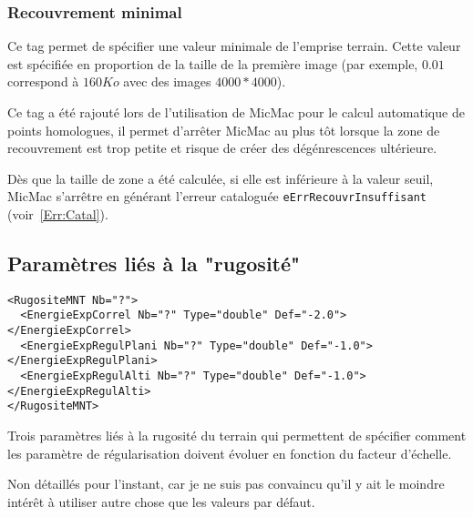 
\subsubsection{Recouvrement minimal}

Ce tag permet de sp\'ecifier une valeur minimale de l'emprise
terrain. Cette valeur est sp\'ecifi\'ee en proportion de la
taille de la premi\`ere image (par exemple, $0.01$ correspond
\`a $160 Ko$ avec des images $4000*4000$).

Ce tag a \'et\'e rajout\'e lors de l'utilisation de MicMac pour
le calcul automatique de points homologues, il permet d'arr\^eter MicMac
au plus t\^ot lorsque la zone de recouvrement est trop petite
et risque de cr\'eer des d\'eg\'enrescences ult\'erieure.

D\`es que la taille de zone a \'et\'e calcul\'ee, si elle est inf\'erieure
\`a la valeur seuil, MicMac s'arr\^etre en g\'en\'erant l'erreur
catalogu\'ee {\tt eErrRecouvrInsuffisant} (voir~\ref{Err:Catal}).



\subsection{Param\`etres li\'es \`a la "rugosit\'e"}

\begin{verbatim}
<RugositeMNT Nb="?">
  <EnergieExpCorrel Nb="?" Type="double" Def="-2.0">      </EnergieExpCorrel>
  <EnergieExpRegulPlani Nb="?" Type="double" Def="-1.0">  </EnergieExpRegulPlani>
  <EnergieExpRegulAlti Nb="?" Type="double" Def="-1.0">   </EnergieExpRegulAlti>
</RugositeMNT>
\end{verbatim}


Trois param\`etres li\'es \`a la rugosit\'e du terrain
qui permettent de sp\'ecifier comment les param\`etre
de  r\'egularisation doivent \'evoluer en fonction du facteur
d'\'echelle. 

Non d\'etaill\'es pour l'instant, car je ne suis pas convaincu
qu'il y ait le moindre int\'er\^et \`a utiliser autre chose
que les valeurs par d\'efaut.


